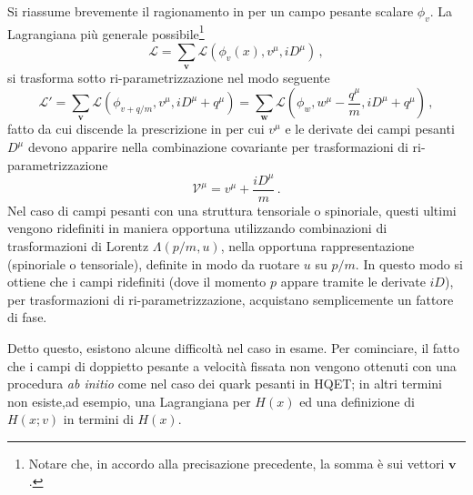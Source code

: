 \documentclass{article}
\begin{document}
Si riassume brevemente il ragionamento in \cite{article:Luke_Manohar} per un campo pesante scalare $\phi_v$. La Lagrangiana più generale possibile\footnote{Notare che, in accordo alla precisazione precedente, la somma è sui vettori $\mathbf{v}$.} 
\begin{equation}
  \mathcal{L} = \sum_\mathbf{v} \mathcal{L} \left( \phi_v (x), v^\mu, i D^\mu \right) \, ,
  \label{eq:luke_manohar_sum}
\end{equation}
si trasforma sotto ri\hyp{}parametrizzazione nel modo seguente
\begin{equation}
  \mathcal{L}' = \sum_\mathbf{v} \mathcal{L} \left( \phi_{v+q/m}, v^\mu, i D^\mu + q^\mu \right) = \sum_\mathbf{w} \mathcal{L} \left( \phi_w, w^\mu - \frac{q^\mu}{m}, i D^\mu + q^\mu \right) \, ,
\end{equation}
fatto da cui discende la prescrizione in \cite{article:Luke_Manohar} per cui $v^\mu$ e le derivate dei campi pesanti $D^\mu$ devono apparire nella combinazione covariante per trasformazioni di ri\hyp{}parametrizzazione
\begin{equation}
  \mathcal{V}^\mu = v^\mu + \frac{i D^\mu}{m} \, .
\end{equation}
Nel caso di campi pesanti con una struttura tensoriale o spinoriale, questi ultimi vengono ridefiniti in maniera opportuna utilizzando combinazioni di trasformazioni di Lorentz $\Lambda(p/m,u)$, nella opportuna rappresentazione (spinoriale o tensoriale), definite in modo da ruotare $u$ su $p/m$. In questo modo si ottiene che i campi ridefiniti (dove il momento $p$ appare tramite le derivate $i D$), per trasformazioni di ri\hyp{}parametrizzazione, acquistano semplicemente un fattore di fase. 

Detto questo, esistono alcune difficoltà nel caso in esame. Per cominciare, il fatto che i campi di doppietto pesante a velocità fissata non vengono ottenuti con una procedura \textit{ab initio} come nel caso dei quark pesanti in HQET; in altri termini non esiste,ad esempio, una Lagrangiana per $H(x)$ ed una definizione di $H(x;v)$ in termini di $H(x)$.
\end{document}
